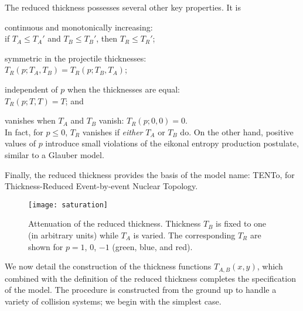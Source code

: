 \documentclass[aps,prc,reprint,amsmath,nofootinbib]{revtex4-1}
\newcommand{\trento}{T\raisebox{-.5ex}{R}ENTo}
\begin{document}
The reduced thickness possesses several other key properties.  It is
\begin{enumerate*}
  \renewcommand{\labelenumi}{(\alph{enumi})}
  \item continuous and monotonically increasing: \\
    if $T_A \leq T_A'$ and $T_B \leq T_B'$, then $T_R \leq T_R'$;
  \item symmetric in the projectile thicknesses: \\
    $T_R(p; T_A, T_B) = T_R(p; T_B, T_A)$;
  \item independent of $p$ when the thicknesses are equal: \\
    $T_R(p; T, T) = T$; and
  \item vanishes when $T_A$ and $T_B$ vanish: $T_R(p; 0, 0) = 0$. \\
    In fact, for $p \leq 0$, $T_R$ vanishes if \emph{either} $T_A$ or $T_B$ do.
    On the other hand, positive values of $p$ introduce small violations of the eikonal entropy production postulate, similar to a Glauber model.
\end{enumerate*}

Finally, the reduced thickness provides the basis of the model name:
\trento, for Thickness-Reduced Event-by-event Nuclear Topology.

\begin{figure}[t]
  \texttt{[image: saturation]}
  \caption{
    \label{fig:saturation}
    Attenuation of the reduced thickness.  Thickness $T_B$ is fixed to one (in arbitrary units) while $T_A$ is
    varied.  The corresponding $T_R$ are shown for $p = 1$, 0, $-1$ (green, blue, and red).
  }
\end{figure}

We now detail the construction of the thickness functions $T_{A,B}(x, y)$, which combined with the definition
of the reduced thickness completes the specification of the model.  The procedure is constructed from the
ground up to handle a variety of collision systems; we begin with the simplest case.

\end{document}
